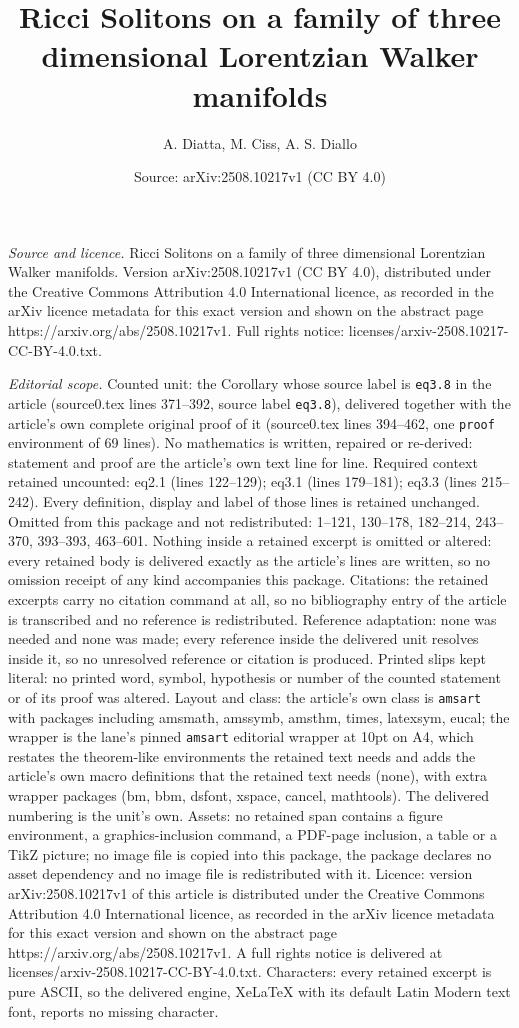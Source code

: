 \documentclass[10pt,a4paper]{amsart}
\title[Ricci Solitons on a family of three dimensional Lorentzian W]{Ricci Solitons on a family of three dimensional Lorentzian Walker manifolds}
\author{A. Diatta, M. Ciss, A. S. Diallo}
\date{Source: arXiv:2508.10217v1 (CC BY 4.0)}
\begin{document}
\maketitle

\noindent\emph{Source and licence.} Ricci Solitons on a family of three dimensional Lorentzian Walker manifolds. Version arXiv:2508.10217v1 (CC BY 4.0), distributed under the Creative Commons Attribution 4.0 International licence, as recorded in the arXiv licence metadata for this exact version and shown on the abstract page https://arxiv.org/abs/2508.10217v1. Full rights notice: licenses/arxiv-2508.10217-CC-BY-4.0.txt.\par\smallskip

\noindent\textit{Editorial scope.} Counted unit: the Corollary whose source label is \texttt{eq3.8} in the article (source0.tex lines 371--392, source label \texttt{eq3.8}), delivered together with the article's own complete original proof of it (source0.tex lines 394--462, one \texttt{proof} environment of 69 lines). No mathematics is written, repaired or re-derived: statement and proof are the article's own text line for line. Required context retained uncounted: eq2.1 (lines 122--129); eq3.1 (lines 179--181); eq3.3 (lines 215--242). Every definition, display and label of those lines is retained unchanged. Omitted from this package and not redistributed: 1--121, 130--178, 182--214, 243--370, 393--393, 463--601. Nothing inside a retained excerpt is omitted or altered: every retained body is delivered exactly as the article's lines are written, so no omission receipt of any kind accompanies this package. Citations: the retained excerpts carry no citation command at all, so no bibliography entry of the article is transcribed and no reference is redistributed. Reference adaptation: none was needed and none was made; every reference inside the delivered unit resolves inside it, so no unresolved reference or citation is produced. Printed slips kept literal: no printed word, symbol, hypothesis or number of the counted statement or of its proof was altered. Layout and class: the article's own class is \texttt{amsart} with packages including amsmath, amssymb, amsthm, times, latexsym, eucal; the wrapper is the lane's pinned \texttt{amsart} editorial wrapper at 10pt on A4, which restates the theorem-like environments the retained text needs and adds the article's own macro definitions that the retained text needs (none), with extra wrapper packages (bm, bbm, dsfont, xspace, cancel, mathtools). The delivered numbering is the unit's own. Assets: no retained span contains a figure environment, a graphics-inclusion command, a PDF-page inclusion, a table or a TikZ picture; no image file is copied into this package, the package declares no asset dependency and no image file is redistributed with it. Licence: version arXiv:2508.10217v1 of this article is distributed under the Creative Commons Attribution 4.0 International licence, as recorded in the arXiv licence metadata for this exact version and shown on the abstract page https://arxiv.org/abs/2508.10217v1. A full rights notice is delivered at licenses/arxiv-2508.10217-CC-BY-4.0.txt. Characters: every retained excerpt is pure ASCII, so the delivered engine, XeLaTeX with its default Latin Modern text font, reports no missing character.
\end{document}
